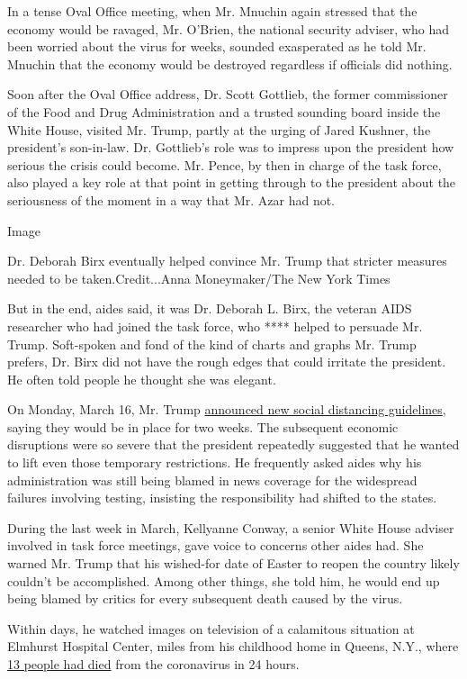 In a tense Oval Office meeting, when Mr. Mnuchin again stressed that the
economy would be ravaged, Mr. O'Brien, the national security adviser,
who had been worried about the virus for weeks, sounded exasperated as
he told Mr. Mnuchin that the economy would be destroyed regardless if
officials did nothing.

Soon after the Oval Office address, Dr. Scott Gottlieb, the former
commissioner of the Food and Drug Administration and a trusted sounding
board inside the White House, visited Mr. Trump, partly at the urging of
Jared Kushner, the president's son-in-law. Dr. Gottlieb's role was to
impress upon the president how serious the crisis could become. Mr.
Pence, by then in charge of the task force, also played a key role at
that point in getting through to the president about the seriousness of
the moment in a way that Mr. Azar had not.

Image

Dr. Deborah Birx eventually helped convince Mr. Trump that stricter
measures needed to be taken.Credit...Anna Moneymaker/The New York Times

But in the end, aides said, it was Dr. Deborah L. Birx, the veteran AIDS
researcher who had joined the task force, who **** helped to persuade
Mr. Trump. Soft-spoken and fond of the kind of charts and graphs Mr.
Trump prefers, Dr. Birx did not have the rough edges that could irritate
the president. He often told people he thought she was elegant.

On Monday, March 16, Mr. Trump
\href{https://www.nytimes.com/2020/03/16/us/politics/trump-coronavirus-guidelines.html}{announced
new social distancing guidelines}, saying they would be in place for two
weeks. The subsequent economic disruptions were so severe that the
president repeatedly suggested that he wanted to lift even those
temporary restrictions. He frequently asked aides why his administration
was still being blamed in news coverage for the widespread failures
involving testing, insisting the responsibility had shifted to the
states.

During the last week in March, Kellyanne Conway, a senior White House
adviser involved in task force meetings, gave voice to concerns other
aides had. She warned Mr. Trump that his wished-for date of Easter to
reopen the country likely couldn't be accomplished. Among other things,
she told him, he would end up being blamed by critics for every
subsequent death caused by the virus.

Within days, he watched images on television of a calamitous situation
at Elmhurst Hospital Center, miles from his childhood home in Queens,
N.Y., where
\href{https://www.nytimes.com/2020/03/25/nyregion/nyc-coronavirus-hospitals.html}{13
people had died} from the coronavirus in 24 hours.

